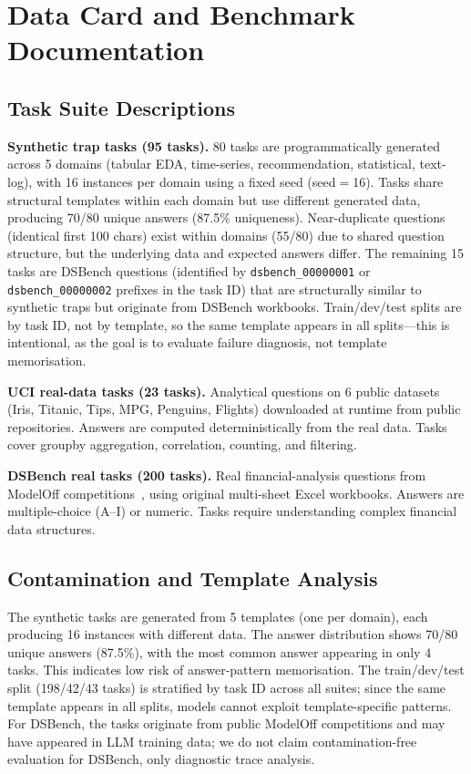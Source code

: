 \section{Data Card and Benchmark Documentation}
\label{app:datacard}

\subsection{Task Suite Descriptions}

\textbf{Synthetic trap tasks (95 tasks).} 80 tasks are programmatically generated across 5 domains (tabular EDA, time-series, recommendation, statistical, text-log), with 16 instances per domain using a fixed seed (seed$=$16). Tasks share structural templates within each domain but use different generated data, producing 70/80 unique answers (87.5\% uniqueness). Near-duplicate questions (identical first 100 chars) exist within domains (55/80) due to shared question structure, but the underlying data and expected answers differ. The remaining 15 tasks are DSBench questions (identified by \texttt{dsbench\_00000001} or \texttt{dsbench\_00000002} prefixes in the task ID) that are structurally similar to synthetic traps but originate from DSBench workbooks. Train/dev/test splits are by task ID, not by template, so the same template appears in all splits---this is intentional, as the goal is to evaluate failure diagnosis, not template memorisation.

\textbf{UCI real-data tasks (23 tasks).} Analytical questions on 6 public datasets (Iris, Titanic, Tips, MPG, Penguins, Flights) downloaded at runtime from public repositories. Answers are computed deterministically from the real data. Tasks cover groupby aggregation, correlation, counting, and filtering.

\textbf{DSBench real tasks (200 tasks).} Real financial-analysis questions from ModelOff competitions~\citep{jing2024dsbench}, using original multi-sheet Excel workbooks. Answers are multiple-choice (A--I) or numeric. Tasks require understanding complex financial data structures.

\subsection{Contamination and Template Analysis}
\label{app:contamination}

The synthetic tasks are generated from 5 templates (one per domain), each producing 16 instances with different data. The answer distribution shows 70/80 unique answers (87.5\%), with the most common answer appearing in only 4 tasks. This indicates low risk of answer-pattern memorisation. The train/dev/test split (198/42/43 tasks) is stratified by task ID across all suites; since the same template appears in all splits, models cannot exploit template-specific patterns. For DSBench, the tasks originate from public ModelOff competitions and may have appeared in LLM training data; we do not claim contamination-free evaluation for DSBench, only diagnostic trace analysis.


